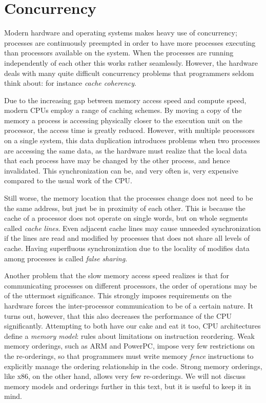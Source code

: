 \section{Concurrency\label{sec:background-concurrency}}

Modern hardware and operating systems makes heavy use of concurrency; processes are continuously
preempted in order to have more processes executing than processors available on the system.  When
the processes are running independently of each other this works rather seamlessly.  However, the
hardware deals with many quite difficult concurrency problems that programmers seldom think about:
for instance \emph{cache coherency}.

Due to the increasing gap between memory access speed and compute speed, modern CPUs employ a range
of caching schemes. By moving a copy of the memory a process is accessing physically closer to the
execution unit on the processor, the access time is greatly reduced. However, with multiple
processors on a single system, this data duplication introduces problems when two processes are
accessing the same data, as the hardware must realize that the local data that each process have
may be changed by the other process, and hence invalidated. This synchronization can be, and very
often is, very expensive compared to the usual work of the CPU\@.

Still worse, the memory location that the processes change does not need to be the same address,
but just be in proximity of each other. This is because the cache of a processor does not operate
on single words, but on whole segments called \emph{cache lines}. Even adjacent cache lines may
cause unneeded synchronization if the lines are read and modified by processes that does not share
all levels of cache. Having superfluous synchronization due to the locality of modifies data among
processes is called \emph{false sharing}.

Another problem that the slow memory access speed realizes is that for communicating processes on
different processors, the order of operations may be of the uttermost significance. This strongly
imposes requirements on the hardware forces the inter-processor communication to be of a certain
nature. It turns out, however, that this also decreases the performance of the CPU significantly.
Attempting to both have our cake and eat it too, CPU architectures define a \emph{memory model}:
rules about limitations on instruction reordering. Weak memory orderings, such as ARM and PowerPC,
impose very few restrictions on the re-orderings, so that programmers must write memory \emph{fence}
instructions to explicitly manage the ordering relationship in the code. Strong memory orderings,
like x86, on the other hand, allows very few re-orderings. We will not discuss memory models and
orderings further in this text, but it is useful to keep it in mind.


